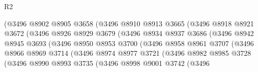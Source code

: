 \begin{lexlean}{R2}
\begin{coremodule}
                              (@3496
                                @8902
                                @8905
                                @3658
                                (@3496
                                  @8910
                                  @8913
                                  @3665
                                  (@3496
                                    @8918
                                    @8921
                                    @3672
                                    (@3496
                                      @8926
                                      @8929
                                      @3679
                                      (@3496
                                        @8934
                                        @8937
                                        @3686
                                        (@3496
                                          @8942
                                          @8945
                                          @3693
                                          (@3496
                                            @8950
                                            @8953
                                            @3700
                                            (@3496
                                              @8958
                                              @8961
                                              @3707
                                              (@3496
                                                @8966
                                                @8969
                                                @3714
                                                (@3496
                                                  @8974
                                                  @8977
                                                  @3721
                                                  (@3496
                                                    @8982
                                                    @8985
                                                    @3728
                                                    (@3496
                                                      @8990
                                                      @8993
                                                      @3735
                                                      (@3496
                                                        @8998
                                                        @9001
                                                        @3742
                                                        (@3496

\end{coremodule}
\end{lexlean}
